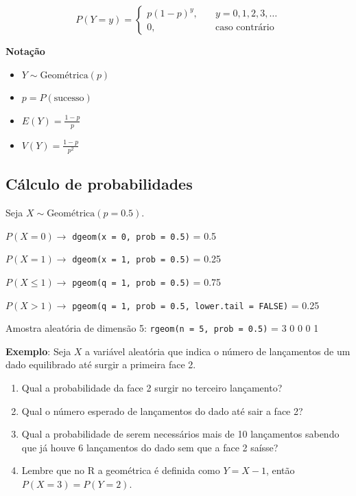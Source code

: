 \documentclass[
]{book}
\providecommand{\tightlist}{%
  \setlength{\itemsep}{0pt}\setlength{\parskip}{0pt}}
\begin{document}
\[P(Y=y) = \begin{cases}
p(1-p)^{y},& \quad y=0,1,2,3,\ldots \\
0,& \quad \text{caso contrário}
\end{cases}\]

\textbf{Notação}

\begin{itemize}
\tightlist
\item
  \(Y \sim \text{Geométrica}(p)\)
\item
  \(p = P(\text{sucesso})\)
\item
  \(E(Y) = \frac{1-p}{p}\)
\item
  \(V(Y) = \frac{1-p}{p^2}\)
\end{itemize}

\subsection{Cálculo de probabilidades}\label{cuxe1lculo-de-probabilidades-2}

Seja \(X\sim \text{Geométrica}(p=0.5)\).

\(P(X=0) \to\) \texttt{dgeom(x\ =\ 0,\ prob\ =\ 0.5)} = 0.5

\(P(X=1) \to\) \texttt{dgeom(x\ =\ 1,\ prob\ =\ 0.5)} = 0.25

\(P(X \leq 1) \to\) \texttt{pgeom(q\ =\ 1,\ prob\ =\ 0.5)} = 0.75

\(P(X > 1) \to\) \texttt{pgeom(q\ =\ 1,\ prob\ =\ 0.5,\ lower.tail\ =\ FALSE)} = 0.25

Amostra aleatória de dimensão 5: \texttt{rgeom(n\ =\ 5,\ prob\ =\ 0.5)} = 3 0 0 0 1

\textbf{Exemplo}: Seja \(X\) a variável aleatória que indica o número de lançamentos de um dado equilibrado até surgir a primeira face 2.

\begin{enumerate}
\def\labelenumi{(\alph{enumi})}
\item
  Qual a probabilidade da face 2 surgir no terceiro lançamento?
\item
  Qual o número esperado de lançamentos do dado até sair a face 2?
\item
  Qual a probabilidade de serem necessários mais de 10 lançamentos sabendo que já houve 6 lançamentos do dado sem que a face 2 saísse?
\item
  Lembre que no R a geométrica é definida como \(Y = X-1\), então \(P(X=3)=P(Y=2)\).
\end{enumerate}
\end{document}
